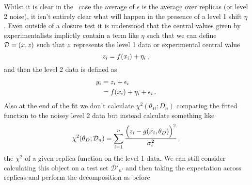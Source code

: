 Whilst it is clear in the \nnpdf\ case the average of $\epsilon$ is the average
over replicas (or level 2 noise), it isn't entirely clear what will happen in
the presence of a level 1 shift $\eta$. Even outside of a closure test it is
understood that the central values given by experimentalists implictly contain
a term like $\eta$ such that we can define $\mathcal{D} = (x, z)$ such that
$z$ represents the level 1 data or experimental central value
\begin{equation}
    \label{eq:DefLev1}
    z_{i} = f(x_i) + \eta_i \, ,
\end{equation}
and then the level 2 data is defined as
\begin{align}
    \label{eq:DefLev2}
    y_{i} &= z_i + \epsilon_i \\
    &= f(x_i) + \eta_i  + \epsilon_i \, .
\end{align}
Also at the end of the fit we don't calculate $\chi^2(\theta_D; D_n)$ comparing
the fitted function to the noisey level 2 data but instead calculate something
like
\begin{equation}
    \label{eq:DefRepChi2}
    \chi^2(\theta_D; \mathcal{D}_{n}) = \sum_{i=1}^{n}
    \frac{\Big(
        z_i - g(x_i,\theta_D)
    \Big)^2}{\sigma_i^2}\, ,
\end{equation}
the $\chi^2$ of a given replica function on the level 1 data. We can still
consider calculating this object on a test set $\mathcal{D}'_{n'}$ and then
taking the expectation across replicas and perform the decomposition as before
